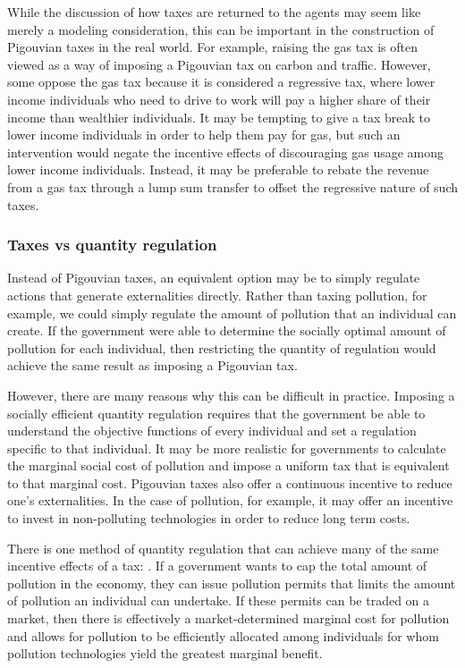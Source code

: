 While the discussion of how taxes are returned to the agents may seem like merely a modeling consideration, this can be important in the construction of Pigouvian taxes in the real world. For example, raising the gas tax is often viewed as a way of imposing a Pigouvian tax on carbon and traffic. However, some oppose the gas tax because it is considered a regressive tax, where lower income individuals who need to drive to work will pay a higher share of their income than wealthier individuals. It may be tempting to give a tax break to lower income individuals in order to help them pay for gas, but such an intervention would negate the incentive effects of discouraging gas usage among lower income individuals. Instead, it may be preferable to rebate the revenue from a gas tax through a lump sum transfer to offset the regressive nature of such taxes.

\subsubsection*{Taxes vs quantity regulation}
Instead of Pigouvian taxes, an equivalent option may be to simply regulate actions that generate externalities directly. Rather than taxing pollution, for example, we could simply regulate the amount of pollution that an individual can create. If the government were able to determine the socially optimal amount of pollution for each individual, then restricting the quantity of regulation would achieve the same result as imposing a Pigouvian tax.

However, there are many reasons why this can be difficult in practice. Imposing a socially efficient quantity regulation requires that the government be able to understand the objective functions of every individual and set a regulation specific to that individual. It may be more realistic for governments to calculate the marginal social cost of pollution and impose a uniform tax that is equivalent to that marginal cost. Pigouvian taxes also offer a continuous incentive to reduce one's externalities. In the case of pollution, for example, it may offer an incentive to invest in non-polluting technologies in order to reduce long term costs. 

There is one method of quantity regulation that can achieve many of the same incentive effects of a tax: . If a government wants to cap the total amount of pollution in the economy, they can issue pollution permits that limits the amount of pollution an individual can undertake. If these permits can be traded on a market, then there is effectively a market-determined marginal cost for pollution and allows for pollution to be efficiently allocated among individuals for whom pollution technologies yield the greatest marginal benefit. 

